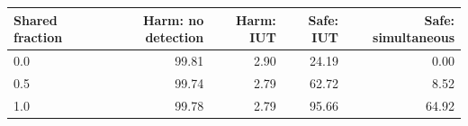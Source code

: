 \begin{tabular}{lrrrr}
\toprule
Shared fraction & Harm: no detection & Harm: IUT & Safe: IUT & Safe: simultaneous \\
\midrule
0.0 & 99.81 & 2.90 & 24.19 & 0.00 \\
0.5 & 99.74 & 2.79 & 62.72 & 8.52 \\
1.0 & 99.78 & 2.79 & 95.66 & 64.92 \\
\bottomrule
\end{tabular}
